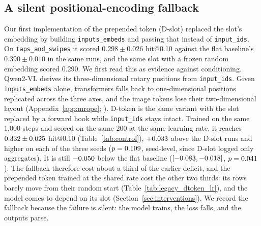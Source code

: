 \documentclass[letterpaper]{article} %
\makeatletter
\newcommand{\hitat}[1]{hit@#1}
\newcommand{\mix}[1]{\texttt{#1}}
\makeatother
\begin{document}
\subsection{A silent positional-encoding fallback}
\label{sec:mrope}
Our first implementation of the prepended token (D-slot) replaced the slot's embedding by building \texttt{inputs\_embeds} and passing that instead of \texttt{input\_ids}. On \mix{taps\_and\_swipes} it scored $0.298 \pm 0.026$ \hitat{0.10} against the flat baseline's $0.390 \pm 0.010$ in the same runs, and the same slot with a frozen random embedding scored 0.290. We first read this as evidence against conditioning. Qwen2-VL derives its three-dimensional rotary positions from \texttt{input\_ids}. Given \texttt{inputs\_embeds} alone, transformers falls back to one-dimensional positions replicated across the three axes, and the image tokens lose their two-dimensional layout (Appendix~\ref{app:mrope}; \citealp{hfissue35463}). D-token is the same variant with the slot replaced by a forward hook while \texttt{input\_ids} stays intact. Trained on the same 1,000 steps and scored on the same 200 at the same learning rate, it reaches $0.332 \pm 0.025$ \hitat{0.10} (Table~\ref{tab:control}), $+0.033$ above the D-slot runs and higher on each of the three seeds ($p = 0.109$, seed-level, since D-slot logged only aggregates). It is still $-0.050$ below the flat baseline ($[-0.083, -0.018]$, $p = 0.041$). The fallback therefore cost about a third of the earlier deficit, and the prepended token trained at the shared rate cost the other two thirds: its rows barely move from their random start (Table~\ref{tab:legacy_dtoken_lr}), and the model comes to depend on its slot (Section~\ref{sec:interventions}). We record the fallback because the failure is silent: the model trains, the loss falls, and the outputs parse.
\end{document}
